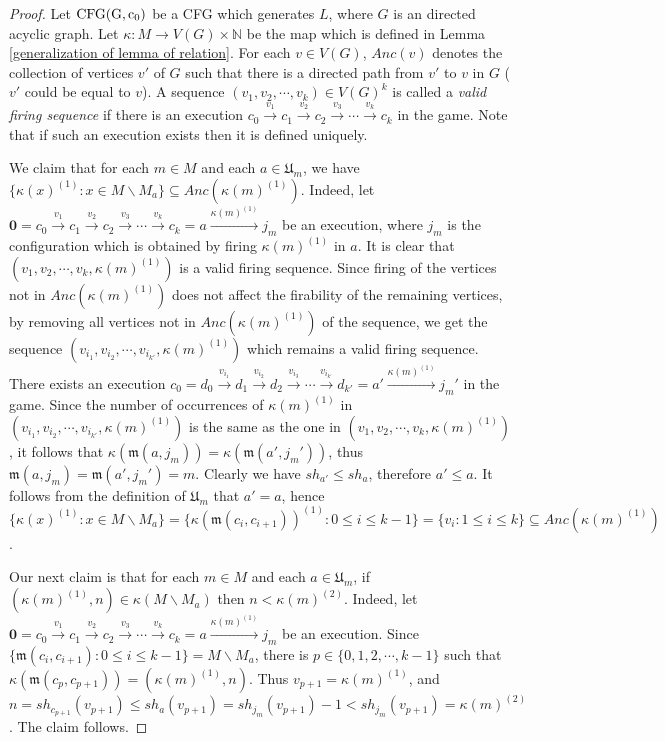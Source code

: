 \documentclass{article}
\theoremstyle{definition}
\newcommand\downvertices[1]{Anc(#1)}
\newcommand\set[1]{\{ #1 \}}
\newcommand\oneshotvector[1]{sh_{#1}}
\begin{document}
\begin{proof}
Let ${\rm CFG(G,c_0)}$ be a CFG which generates $L$, where $G$ is an directed acyclic graph. Let $\kappa:M\to V(G)\times \mathbb{N}$ be the map which is defined in Lemma \ref{generalization of lemma of relation}. For each $v \in V(G)$, $\downvertices{v}$ denotes the collection of vertices $v'$ of $G$ such that  there is a directed path from $v'$ to $v$ in $G$ ($v'$ could be equal to $v$). A sequence $(v_1,v_2,\cdots,v_k)\in V(G)^{k}$ is called a \emph{valid firing sequence} if there is an execution $c_0\overset{v_1}{\to}{c_1}\overset{v_2}{\to}{c_2}\overset{v_3}{\to}\cdots \overset{v_k}{\to}{c_k}$ in the game. Note that if such an execution exists then it is defined uniquely. 

We claim that for each $m \in M$ and each $a \in \mathfrak{U}_m$, we have $\set{\kappa(x)^{(1)}: x \in M\backslash M_a}\subseteq \downvertices{\kappa(m)^{(1)}}$. Indeed, let $\textbf{0}=c_0\overset{v_1}{\to}{c_1}\overset{v_2}{\to}c_2\overset{v_3}{\to}\cdots \overset{v_k}{\to}c_k=a\overset{\kappa(m)^{(1)}}{\to}j_m$ be an execution, where $j_m$ is the configuration which is obtained by firing $\kappa(m)^{(1)}$ in $a$. It is clear that $(v_1,v_2,\cdots,v_k,\kappa(m)^{(1)})$ is a valid firing sequence. Since firing of the vertices not in $\downvertices{\kappa(m)^{(1)}}$ does not affect the firability of the remaining vertices, by removing all vertices not in $\downvertices{\kappa(m)^{(1)}}$ of the sequence, we get the sequence $(v_{i_1},v_{i_2},\cdots,v_{i_{k'}},\kappa(m)^{(1)})$ which remains a valid firing sequence. There exists an execution $c_0=d_0\overset{v_{i_1}}{\to}d_1\overset{v_{i_2}}{\to}d_2\overset{v_{i_3}}{\to}\cdots \overset{v_{i_{k'}}}{\to}d_{k'}=a'\overset{\kappa(m)^{(1)}}{\to}j_m'$ in the game. Since the number of occurrences of $\kappa(m)^{(1)}$ in $(v_{i_1},v_{i_2},\cdots,v_{i_{k'}},\kappa(m)^{(1)})$ is the same as the one in $(v_1,v_2,\cdots,v_k,\kappa(m)^{(1)})$, it follows that $\kappa(\mathfrak{m}(a,j_m))=\kappa(\mathfrak{m}(a',j_m'))$, thus $\mathfrak{m}(a,j_m)=\mathfrak{m}(a',j_m')=m$. Clearly we have $\oneshotvector{a'}\leq \oneshotvector{a}$, therefore $a'\leq a$. It follows from the definition of  $\mathfrak{U}_m$ that $a'=a$, hence $\set{\kappa(x)^{(1)}: x\in M\backslash M_a}=\set{\kappa(\mathfrak{m}(c_i,c_{i+1}))^{(1)}:0 \leq i \leq k-1}=\set{v_i : 1 \leq i \leq k} \subseteq \downvertices{\kappa(m)^{(1)}}$.

Our next claim is that for each $m \in M$ and each $a \in \mathfrak{U}_m$, if $(\kappa(m)^{(1)},n)\in \kappa(M\backslash M_a)$ then $n < \kappa(m)^{(2)}$. Indeed, let $\textbf{0}=c_0\overset{v_1}{\to}c_1\overset{v_2}{\to}c_2\overset{v_3}{\to}\cdots \overset{v_k}{\to}c_k=a\overset{\kappa(m)^{(1)}}{\to} j_m$ be an execution. Since $\set{\mathfrak{m}(c_i,c_{i+1}):0\leq i \leq k-1}=M\backslash M_a$, there is $p\in \set{0,1,2,\cdots, k-1}$ such that $\kappa(\mathfrak{m}(c_p,c_{p+1}))=(\kappa(m)^{(1)},n)$. Thus $v_{p+1}=\kappa(m)^{(1)}$, and $n=\oneshotvector{c_{p+1}}(v_{p+1})\leq \oneshotvector{a}(v_{p+1})=\oneshotvector{j_m}(v_{p+1})-1<\oneshotvector{j_m}(v_{p+1})=\kappa(m)^{(2)}$. The claim follows.


\end{proof}
\end{document}
